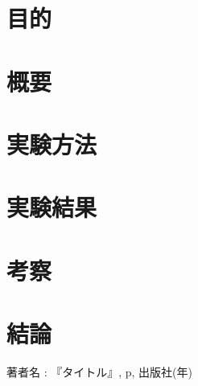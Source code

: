 \documentclass{jsarticle}
\begin{document}
\section{目的}

\section{概要}

\section{実験方法}

\section{実験結果}

\section{考察}

\section{結論}

\begin{thebibliography}{9}
    \item
        著者名 : 『タイトル』, p, 出版社(年)
\end{thebibliography}
\end{document}
